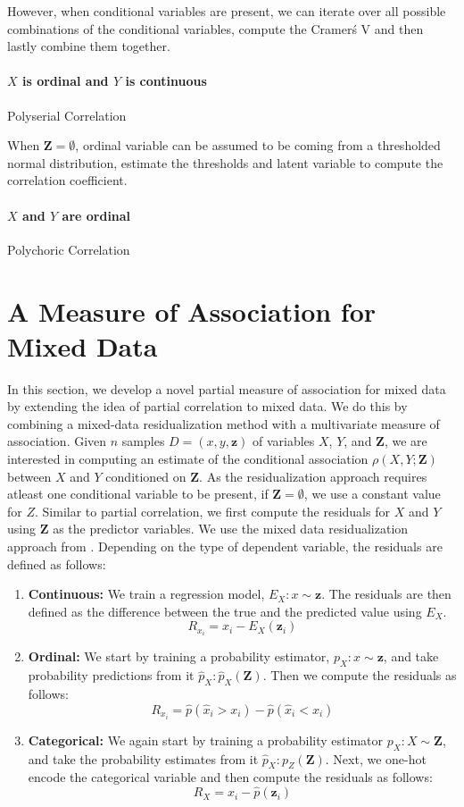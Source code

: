\documentclass[letterpaper]{article} %
\begin{document}
However, when conditional variables are present, we can iterate over all
possible combinations of the conditional variables, compute the Cramer\'s V and
then lastly combine them together. 

\paragraph{$ X $ is ordinal and $ Y $ is continuous}
Polyserial Correlation

When $ \bm{Z} = \emptyset $, ordinal variable can be assumed to be coming from
a thresholded normal distribution, estimate the thresholds and latent variable
to compute the correlation coefficient.

\paragraph{$ X $ and $ Y $ are ordinal}
Polychoric Correlation

\section{A Measure of Association for Mixed Data}
\label{sec:mixed_association}

In this section, we develop a novel partial measure of association for mixed
data by extending the idea of partial correlation to mixed data. We do this by
combining a mixed-data residualization method with a multivariate measure of
association. Given $ n $ samples $ D = (x, y, \bm{z}) $ of variables $ X $, $ Y
$, and $ \bm{Z} $, we are interested in computing an estimate of the
conditional association $ \rho(X, Y; \bm{Z}) $ between $ X $ and $ Y $
conditioned on $ \bm{Z} $. As the residualization approach requires atleast one
conditional variable to be present, if $ \bm{Z} = \emptyset $, we use a
constant value for $ Z $. Similar to partial correlation, we first compute the
residuals for $ X $ and $ Y $ using $ \bm{Z} $ as the predictor variables. We
use the mixed data residualization approach from \citet{Ankan2023}. Depending
on the type of dependent variable, the residuals are defined as follows:

\begin{enumerate}
	\item \textbf{Continuous:} We train a regression
		model, $ E_X: x \sim \bm{z} $. The residuals are then defined
		as the difference between the true and the predicted value using
		$ E_X $.
		$$ R_{x_i} = x_i - E_X(\bm{z}_i) $$
	\item \textbf{Ordinal:} We start by training a probability
		estimator, $ p_X: x \sim \bm{z} $, and take probability
		predictions from it $ \hat{p}_X: \hat{p}_X(\bm{Z}) $. Then we
		compute the residuals as follows:
		$$ R_{x_i} = \hat{p}(\hat{x}_i > x_i) - \hat{p}(\hat{x}_i < x_i) $$
	\item \textbf{Categorical:} We again start by training a
		probability estimator $ p_X: X \sim \bm{Z} $, and take the
		probability estimates from it $ \hat{p}_X: p_Z(\bm{Z}) $. Next,
		we one-hot encode the categorical variable and then compute the
		residuals as follows: 
		$$ R_X = x_i - \hat{p}(\bm{z}_i) $$
\end{enumerate}
\end{document}
